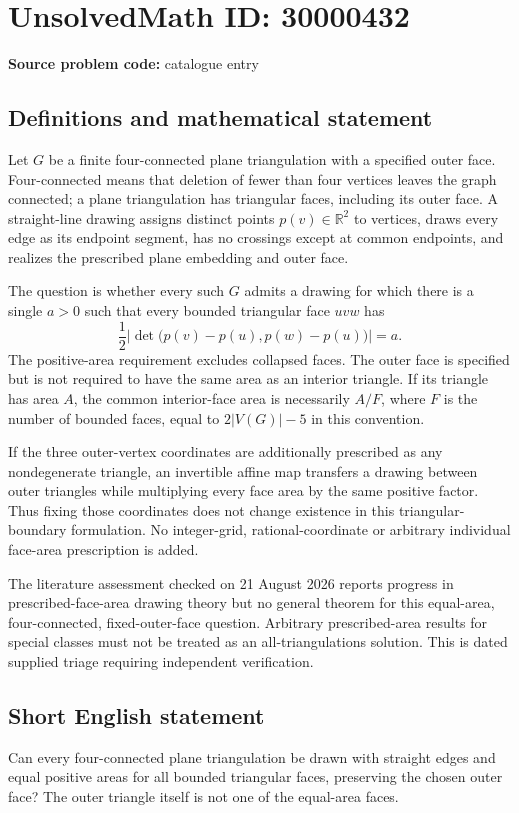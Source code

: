 \documentclass[11pt]{article}
\newcommand{\R}{\mathbb{R}}
\begin{document}
\section*{UnsolvedMath ID: 30000432}
\textbf{Source problem code:} catalogue entry
\subsection{Definitions and mathematical statement}
Let $G$ be a finite four-connected plane triangulation with a specified outer face. Four-connected means that deletion of fewer than four vertices leaves the graph connected; a plane triangulation has triangular faces, including its outer face. A straight-line drawing assigns distinct points $p(v)\in\R^2$ to vertices, draws every edge as its endpoint segment, has no crossings except at common endpoints, and realizes the prescribed plane embedding and outer face.

The question is whether every such $G$ admits a drawing for which there is a single $a>0$ such that every bounded triangular face $uvw$ has
\[
 \frac12\left|\det\bigl(p(v)-p(u),p(w)-p(u)\bigr)\right|=a.
\]
The positive-area requirement excludes collapsed faces. The outer face is specified but is not required to have the same area as an interior triangle. If its triangle has area $A$, the common interior-face area is necessarily $A/F$, where $F$ is the number of bounded faces, equal to $2|V(G)|-5$ in this convention.

If the three outer-vertex coordinates are additionally prescribed as any nondegenerate triangle, an invertible affine map transfers a drawing between outer triangles while multiplying every face area by the same positive factor. Thus fixing those coordinates does not change existence in this triangular-boundary formulation. No integer-grid, rational-coordinate or arbitrary individual face-area prescription is added.

The literature assessment checked on 21 August 2026 reports progress in prescribed-face-area drawing theory but no general theorem for this equal-area, four-connected, fixed-outer-face question. Arbitrary prescribed-area results for special classes must not be treated as an all-triangulations solution. This is dated supplied triage requiring independent verification.
\subsection{Short English statement}
Can every four-connected plane triangulation be drawn with straight edges and equal positive areas for all bounded triangular faces, preserving the chosen outer face? The outer triangle itself is not one of the equal-area faces.
\end{document}
